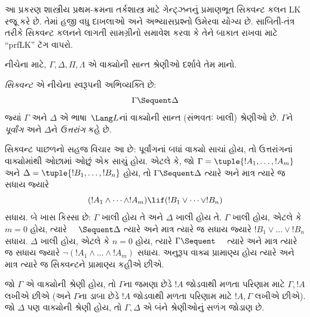\OLEndChapterHook
\endgroup


%
  \begingroup
\makeatletter{}\makeatother

\label{guunit:OLP-0069}

\begin{editorial}
  આ પ્રકરણ શાસ્ત્રીય પ્રથમ-ક્રમના તર્કશાસ્ત્ર માટે ગેન્ટ્ઝનનું પ્રમાણભૂત
  સિક્વન્ટ કલન LK રજૂ કરે છે. તેમાં હજી વધુ દાખલાઓ અને
  અભ્યાસપ્રશ્નો ઉમેરવા યોગ્ય છે. સાબિતી-તંત્ર તરીકે સિક્વન્ટ કલનને લાગતી
  સામગ્રીનો સમાવેશ કરવા કે તેને બાકાત રાખવા માટે ``prfLK'' ટૅગ વાપરો.
\end{editorial}

\begingroup
\makeatletter{}\makeatother


\label{guunit:OLP-0070}


નીચેના માટે, $\Gamma, \Delta, \Pi, \Lambda$ એ વાક્યોની સાન્ત
શ્રેણીઓ દર્શાવે તેમ માનો.

\begin{defn}[સિક્વન્ટ]
\emph{સિક્વન્ટ} એ નીચેના સ્વરૂપની અભિવ્યક્તિ છે:
\[
\Gamma \Sequent \Delta
\]
જ્યાં $\Gamma$ અને $\Delta$ એ ભાષા~$\Lang L$નાં વાક્યોની સાન્ત
(સંભવતઃ ખાલી) શ્રેણીઓ છે. $\Gamma$ને \emph{પૂર્વાંગ} અને $\Delta$ને
\emph{ઉત્તરાંગ} કહે છે.
\end{defn}

\begin{explain}
સિક્વન્ટ પાછળનો સહજ વિચાર આ છે: પૂર્વાંગનાં બધાં વાક્યો સાચાં હોય,
તો ઉત્તરાંગનાં વાક્યોમાંથી ઓછામાં ઓછું એક સાચું હોય. એટલે કે, જો
$\Gamma = \tuple{!A_1, \dots, !A_m}$ અને
$\Delta = \tuple{!B_1, \dots, !B_n}$ હોય, તો
$\Gamma \Sequent \Delta$ ત્યારે અને માત્ર ત્યારે જ સધાય જ્યારે
\[
(!A_1 \land \cdots \land !A_m) \lif (!B_1 \lor \cdots \lor
!B_n)
\]
સધાય. બે ખાસ કિસ્સા છે: $\Gamma$ ખાલી હોય તે અને $\Delta$ ખાલી હોય તે.
$\Gamma$ ખાલી હોય, એટલે કે $m = 0$ હોય, ત્યારે $\quad \Sequent \Delta$
ત્યારે અને માત્ર ત્યારે જ સધાય જ્યારે $!B_1 \lor \dots \lor !B_n$
સધાય. $\Delta$ ખાલી હોય, એટલે કે $n = 0$ હોય, ત્યારે
$\Gamma \Sequent \quad$ ત્યારે અને માત્ર ત્યારે જ સધાય જ્યારે
$\lnot(!A_1 \land \dots \land !A_m)$ સધાય. અનુરૂપ વાક્ય
પ્રામાણ્ય હોય ત્યારે અને માત્ર ત્યારે જ સિક્વન્ટને પ્રામાણ્ય કહીએ છીએ.
\end{explain}

જો $\Gamma$ એ વાક્યોની શ્રેણી હોય, તો $\Gamma$ના જમણા છેડે
$!A$ જોડવાથી મળતા પરિણામ માટે $\Gamma, !A$ લખીએ છીએ (અને $\Gamma$ના
ડાબા છેડે $!A$ જોડવાથી મળતા પરિણામ માટે $!A, \Gamma$ લખીએ છીએ). જો
$\Delta$ પણ વાક્યોની શ્રેણી હોય, તો $\Gamma, \Delta$ એ બંને
શ્રેણીઓનું સળંગ જોડાણ છે.

